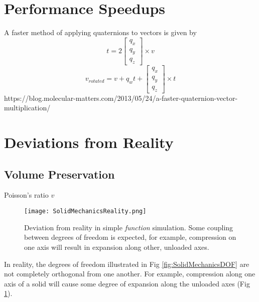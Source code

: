 {\section{Performance Speedups}

A faster method of applying quaternions to vectors is given by
\[ t = 2 \left[ \begin{array}{ccc}
q_x\\
q_y\\
q_z
 \end{array} \right] \times v\]
\[ v_{rotated} = v + q_wt +  \left[ \begin{array}{ccc}
q_x\\
q_y\\
q_z
 \end{array} \right] \times t\]
 https://blog.molecular-matters.com/2013/05/24/a-faster-quaternion-vector-multiplication/


\section{Deviations from Reality}

\subsection{Volume Preservation}

Poisson's ratio $v$

\begin{figure}
  \texttt{[image: SolidMechanicsReality.png]}
  \caption{Deviation from reality in simple \textit{function} simulation.  Some coupling between degrees of freedom is expected, for example, compression on one axis will result in expansion along other, unloaded axes.}
  \label{fig:SolidMechanicsReality}
\end{figure}

In reality, the degrees of freedom illustrated in Fig \ref{fig:SolidMechanicsDOF} are not completely orthogonal from one another.  For example, compression along one axis of a solid will cause some degree of expansion along the unloaded axes (Fig \ref{fig:SolidMechanicsReality}).


}
